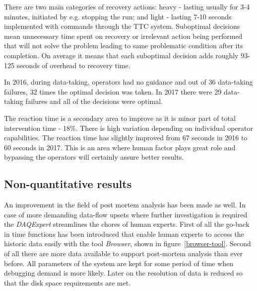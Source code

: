 \documentclass[a4paper]{jpconf}
\begin{document}
There are two main categories of recovery actions: heavy - lasting usually for 3-4 minutes, initiated by e.g. stopping the run; and light - lasting 7-10 seconds implemented with commands through the TTC system. Suboptimal decisions mean unnecessary time spent on recovery or irrelevant action being performed that will not solve the problem leading to same problematic condition after its completion. On average it means that each suboptimal decision adds roughly 93-125 seconds of overhead to recovery time.

In 2016, during data-taking, operators had no guidance and out of 36 data-taking failures, 32 times the optimal decision was taken. In 2017 there were 29 data-taking failures and all of the decisions were optimal.

The reaction time is a secondary area to improve as it is minor part of total intervention time - 18\%. There is high variation depending on individual operator capabilities. The reaction time has slightly improved from 67 seconds in 2016 to 60 seconds in 2017. This is an area where human factor plays great role and bypassing the operators will certainly assure better results.


\subsection{Non-quantitative results}
An improvement in the field of post mortem analysis has been made as well. In case of more demanding data-flow upsets where further investigation is required the{ \it DAQExpert} streamlines the chores of human experts. First of all the go-back in time functions has been introduced that enable human experts to access the historic data easily with the tool{ \it Browser}, shown in figure~\ref {browser-tool}. Second of all there are more data available to support post-mortem analysis than ever before. All parameters of the system are kept for some period of time when debugging demand is more likely. Later on the resolution of data is reduced so that the disk space requirements are met.
\end{document}
